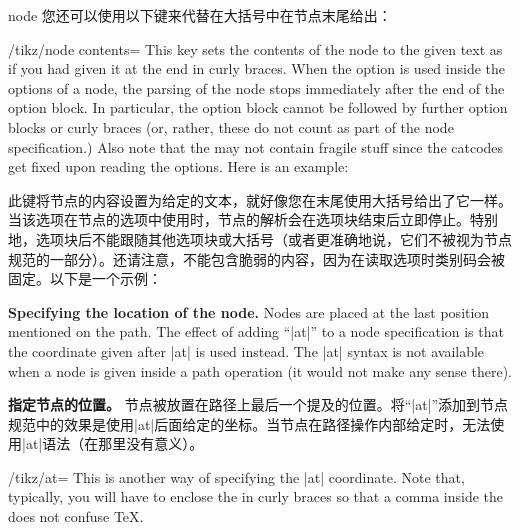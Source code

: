 \begin{pathoperation}{node}
    您还可以使用以下键来代替在大括号中在节点末尾给出：

    \begin{key}{/tikz/node contents=}
    \label{option-node-contents}%
        This key sets the contents of the node to the given text as if you had
        given it at the end in curly braces. When the option is used inside the
        options of a node, the parsing of the node stops immediately after the
        end of the option block. In particular, the option block cannot be
        followed by further option blocks or curly braces (or, rather, these do
        not count as part of the node specification.) Also note that the
         may not contain fragile stuff since the catcodes
        get fixed upon reading the options. Here is an example:
        
        此键将节点的内容设置为给定的文本，就好像您在末尾使用大括号给出了它一样。当该选项在节点的选项中使用时，节点的解析会在选项块结束后立即停止。特别地，选项块后不能跟随其他选项块或大括号（或者更准确地说，它们不被视为节点规范的一部分）。还请注意，不能包含脆弱的内容，因为在读取选项时类别码会被固定。以下是一个示例：


\begin{codeexample}[]
\end{codeexample}
\end{key}

    \medskip
    \textbf{Specifying the location of the node.}
    Nodes are placed at the last position mentioned on the path. The effect of
    adding ``|at|'' to a node specification is that the coordinate given after
    |at| is used instead. The |at| syntax is not available when a node is given
    inside a path operation (it would not make any sense there).

    \textbf{指定节点的位置。}
节点被放置在路径上最后一个提及的位置。将“|at|”添加到节点规范中的效果是使用|at|后面给定的坐标。当节点在路径操作内部给定时，无法使用|at|语法（在那里没有意义）。

    \begin{key}{/tikz/at=}
        This is another way of specifying the |at| coordinate. Note that,
        typically, you will have to enclose the  in curly
        braces so that a comma inside the  does not confuse
        \TeX.


\end{key}
\end{pathoperation}
